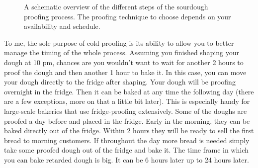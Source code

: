 \begin{figure}[!htb]
  \caption{A schematic overview of the different steps of the sourdough proofing process. The proofing technique to choose
  depends on your availability and schedule.}
  \label{fig:proofing-process}
\end{figure}

To me, the sole purpose of cold proofing is its ability to allow you
to better manage the timing of the whole process. Assuming you finished shaping
your dough at 10 pm, chances are you wouldn't want to wait for another
2 hours to proof the dough and then another 1 hour to bake it. In this case,
you can move your dough directly to the fridge after shaping. Your
dough will be proofing overnight in the fridge. Then it can be baked at any time
the following day (there are a few exceptions, more on that a little bit later).
This is especially handy for large-scale bakeries that use fridge-proofing
extensively. Some of the doughs are proofed a day before and placed in the fridge.
Early in the morning, they can be baked directly out of the fridge. Within 2
hours they will be ready to sell the first bread to morning customers. If
throughout the day more bread is needed simply take some proofed dough out
of the fridge and bake it. The time frame in which you can bake retarded
dough is big. It can be 6 hours later up to 24 hours later.

